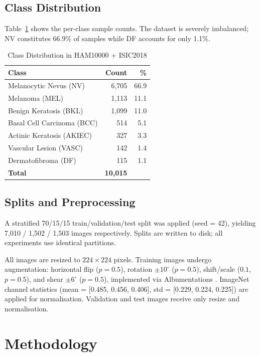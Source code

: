 \documentclass[conference]{IEEEtran}
\begin{document}
\subsection{Class Distribution}
Table~\ref{tab:class_dist} shows the per-class sample counts. The
dataset is severely imbalanced; NV constitutes 66.9\% of samples
while DF accounts for only 1.1\%.

\begin{table}[htbp]
\caption{Class Distribution in HAM10000 + ISIC2018}
\label{tab:class_dist}
\centering
\begin{tabular}{lrr}
\toprule
\textbf{Class} & \textbf{Count} & \textbf{\%} \\
\midrule
Melanocytic Nevus (NV)       & 6,705 & 66.9 \\
Melanoma (MEL)               & 1,113 & 11.1 \\
Benign Keratosis (BKL)       & 1,099 & 11.0 \\
Basal Cell Carcinoma (BCC)   &   514 &  5.1 \\
Actinic Keratosis (AKIEC)    &   327 &  3.3 \\
Vascular Lesion (VASC)       &   142 &  1.4 \\
Dermatofibroma (DF)          &   115 &  1.1 \\
\midrule
\textbf{Total}               & \textbf{10,015} & \\
\bottomrule
\end{tabular}
\end{table}

\subsection{Splits and Preprocessing}
A stratified 70/15/15 train/validation/test split was applied
(seed = 42), yielding 7,010 / 1,502 / 1,503 images respectively.
Splits are written to disk; all experiments use identical partitions.

All images are resized to $224\times224$ pixels. Training images
undergo augmentation: horizontal flip ($p{=}0.5$), rotation
$\pm10^{\circ}$ ($p{=}0.5$), shift/scale ($0.1$, $p{=}0.5$), and
shear $\pm6^{\circ}$ ($p{=}0.5$), implemented via
Albumentations \cite{buslaev2020}. ImageNet channel statistics
(mean = [0.485, 0.456, 0.406], std = [0.229, 0.224, 0.225]) are
applied for normalisation. Validation and test images receive only
resize and normalisation.

\section{Methodology}
\end{document}

